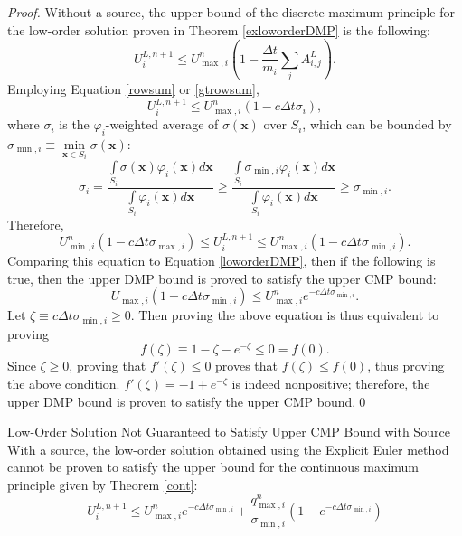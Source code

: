 \begin{proof}
Without a source, the upper bound of the discrete maximum principle for the low-order solution
proven in Theorem \ref{exloworderDMP} is the following:
\[
   U_i^{L,n+1}\leq
   U_{\max,i}^n\left(1-\frac{\Delta t}{m_i}\sum\limits_j A^L_{i,j}\right).
\]
Employing Equation \eqref{rowsum} or \eqref{gtrowsum},
\[
   U_i^{L,n+1} \le
   U_{\max,i}^n(1-c\Delta t\sigma_i),
\]
where $\sigma_i$ is the $\varphi_i$-weighted average of $\sigma(\mathbf{x})$ over
$S_i$, which can be bounded by
$\sigma_{\min,i}\equiv\min\limits_{\mathbf{x}\in S_i}\sigma(\mathbf{x})$:
\[
   \sigma_i = \frac{\int\limits_{S_i}\sigma(\mathbf{x})\varphi_i(\mathbf{x})d\mathbf{x}}{\int\limits_{S_i}\varphi_i(\mathbf{x})d\mathbf{x}}
   \ge \frac{\int\limits_{S_i}\sigma_{\min,i}\varphi_i(\mathbf{x})d\mathbf{x}}{\int\limits_{S_i}\varphi_i(\mathbf{x})d\mathbf{x}}
   \ge \sigma_{\min,i}.
\]
Therefore,
\[
   U_{\min,i}^n(1-c\Delta t\sigma_{\max,i}) \le
   U_i^{L,n+1} \le
   U_{\max,i}^n(1-c\Delta t\sigma_{\min,i}).
\]
Comparing this equation to Equation \eqref{loworderDMP}, then if the following is true,
then the upper DMP bound is proved to satisfy the upper CMP bound:
\[
   U_{\max,i}(1-c\Delta t\sigma_{\min,i}) \le U_{\max,i}^n e^{-c\Delta t\sigma_{\min,i}}.
\]
Let $\zeta\equiv c\Delta t\sigma_{\min,i}\ge 0$. Then proving the above equation is
thus equivalent to proving
\[
   f(\zeta)\equiv 1-\zeta-e^{-\zeta} \le 0 = f(0).
\]
Since $\zeta\ge 0$, proving that $f'(\zeta)\le 0$ proves that $f(\zeta)\le f(0)$, thus
proving the above condition. $f'(\zeta)=-1+e^{-\zeta}$ is indeed nonpositive; therefore,
the upper DMP bound is proven to satisfy the upper CMP bound.\qed
\end{proof}
\begin{corollary}{Low-Order Solution Not Guaranteed to Satisfy Upper CMP Bound with Source}{}
   With a source, the low-order solution obtained using the Explicit Euler
   method cannot be proven to satisfy the upper bound
   for the continuous maximum principle given by Theorem \ref{cont}:
   \[
      U_i^{L,n+1} \le
      U_{\max,i}^n e^{-c\Delta t\sigma_{\min,i}}
      + \frac{q_{\max,i}^n}{\sigma_{\min,i}}(1-e^{-c\Delta t\sigma_{\min,i}})
   \]
\end{corollary}

